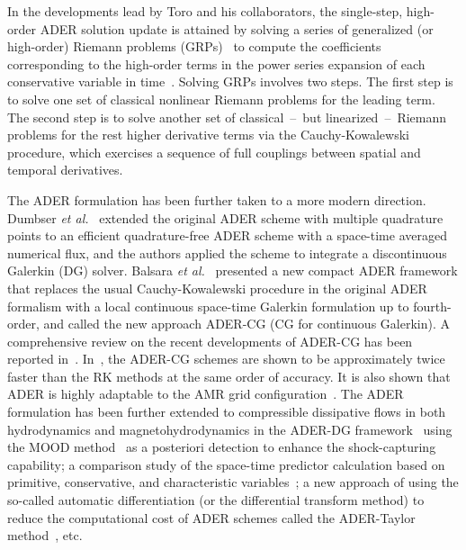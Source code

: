 \documentclass[times,preprint,3p]{elsarticle}
\begin{document}
In the developments lead by Toro and his collaborators,
the single-step, high-order ADER
solution update is attained by solving a series of
generalized (or high-order) Riemann problems
(GRPs)~\cite{van1979towards,ben1984second,ben2007hyperbolic}
to compute the coefficients corresponding to
the high-order terms in the power series expansion
of each conservative variable in
time~\cite{titarev2002ader, titarev2005ader, toro2001towards}.
Solving GRPs involves two steps.
The first step is to solve one set of
classical nonlinear Riemann problems for the leading term.
The second step is to solve another set of classical~--~but linearized~--~Riemann problems
for the rest higher derivative terms via the Cauchy-Kowalewski procedure, which
exercises a sequence of full couplings between spatial and temporal derivatives.

The ADER formulation has been further taken to a more modern direction.
Dumbser \textit{et al.}~\cite{dumbser2008unified} extended the original ADER scheme
with multiple quadrature points to an efficient quadrature-free ADER scheme
with a space-time averaged numerical flux, and the authors
applied the scheme to integrate a discontinuous Galerkin (DG) solver.
Balsara \textit{et al.}~\cite{balsara2009efficient} presented a new compact ADER framework
that replaces the usual Cauchy-Kowalewski procedure in the original ADER formalism
with a local continuous space-time
Galerkin formulation up to fourth-order, and called the new approach
ADER-CG (CG for continuous Galerkin).
A comprehensive review on the recent developments of
ADER-CG has been reported in~\cite{balsara2017higher}.
In~\cite{balsara2013efficient}, the ADER-CG schemes are shown to be approximately
twice faster than the RK methods at the same order of accuracy.
It is also shown that ADER is highly adaptable to the
AMR grid configuration~\cite{dumbser2013ader}.
The ADER formulation has been further extended to compressible
dissipative flows in both hydrodynamics and magnetohydrodynamics
in the ADER-DG framework~\cite{fambri2017space}
using the
MOOD method~\cite{clain2011high,diot2012improved,
diot2013multidimensional,boscheri2015direct,loubere2014new}
as a posteriori detection to
enhance the shock-capturing capability;
a comparison study of the space-time predictor calculation
based on primitive, conservative, and characteristic
variables~\cite{zanotti2016efficient};
a new approach of using the so-called automatic differentiation
(or the differential transform method) to reduce the computational
cost of ADER schemes called the ADER-Taylor method~\cite{norman2012multi, norman2013algorithmic, norman2014weno}, etc.
\end{document}
